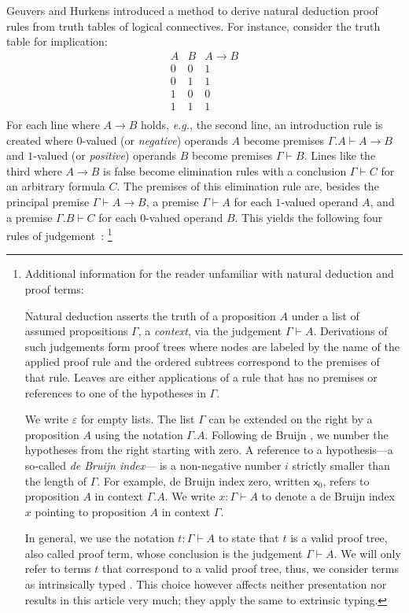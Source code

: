 \documentclass[a4paper,USenglish,cleveref, autoref, thm-restate]{lipics-v2019}
\newcommand{\eg}{\emph{e.g.}\xspace}
\newcommand{\Ge}{\ensuremath{\varepsilon}}
\newcommand{\x}{\mathsf{x}}
\begin{document}
Geuvers and Hurkens \cite{geuversHurkens:icla17} introduced a method to derive natural
deduction proof rules from truth tables of logical connectives.
For instance, consider the truth table for implication:
\[
\begin{array}{cc|c}
  A & B & A \to B \\
\hline
  0 & 0 & 1 \\
  0 & 1 & 1 \\
  1 & 0 & 0 \\
  1 & 1 & 1 \\
\end{array}
\]
For each line where $A \to B$ holds, \eg, the second line, an
introduction rule is created where $0$-valued (or \emph{negative})
operands $A$ become premises $\Gamma.A \vdash A \to B$ and $1$-valued
(or \emph{positive}) operands $B$ become premises $\Gamma \vdash B$.
Lines like the third where $A \to B$ is false become elimination rules
with a conclusion $\Gamma \vdash C$ for an arbitrary formula $C$.
The premises of this elimination rule are,
besides the principal premise $\Gamma \vdash A \to B$,
a premise $\Gamma \vdash A$ for each $1$-valued operand $A$, and
a premise $\Gamma.B \vdash C$ for each $0$-valued operand $B$.
This yields the following four rules of judgement
\,:%
%
\footnote{%
Additional information for the reader unfamiliar with natural deduction and proof terms:
\par
Natural deduction asserts the truth of a proposition $A$
  under a list of assumed propositions $\Gamma$, a \emph{context}, via the
  judgement $\Gamma \vdash A$.  Derivations of such judgements
  form proof trees where nodes are labeled by the name of
  the applied proof rule and the ordered subtrees correspond to the premises
  of that rule.  Leaves are either applications of a rule that has no
  premises or references to one of the hypotheses in $\Gamma$.
\par
  We write $\Ge$ for empty lists.
  The list $\Gamma$ can be extended on the right by a proposition $A$
  using the notation $\Gamma.A$.  Following de Bruijn
  \cite{deBruijn:nameless}, we number the hypotheses from the right
  starting with zero.
  A reference to a hypothesis---a so-called \emph{de Bruijn index}---
  is a
  non-negative number $i$ strictly smaller than the length of $\Gamma$.
  For example, de Bruijn index zero, written $\x_0$,
  refers to proposition $A$ in context $\Gamma.A$.  We write $x :
  \Gamma \vdash A$ to denote a de Bruijn index $x$ pointing to
  proposition $A$ in context $\Gamma$.
\par
  In general, we use the notation $t : \Gamma \vdash A$ to state that
  $t$ is a valid proof tree, also called proof term, whose conclusion
  is the judgement $\Gamma \vdash A$.  We will only refer to terms $t$
  that correspond to a valid proof tree, thus, we consider terms as
  intrinsically typed
  \cite{alti:monadic,bentonHurKennedyMcBride:jar12}.  This choice
  however affects neither presentation nor results in this article
  very much; they apply the same to extrinsic typing.
%
}%
\end{document}
